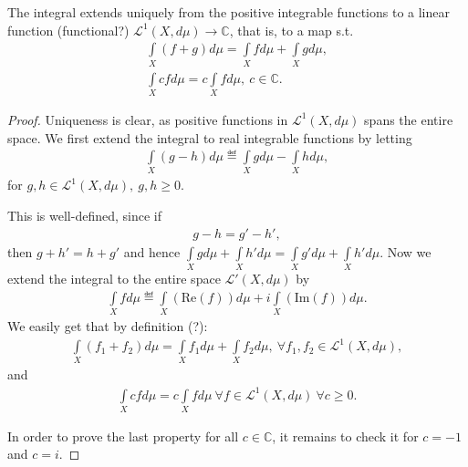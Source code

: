 \begin{prop}
    The integral extends uniquely from the positive integrable functions to a linear function (functional?) \(\mathcal{L}^{1}(X, d\mu) \rightarrow \mathbb{C}\),
    that is, to a map s.t.
    \begin{align*}
        \int\limits_{X}(f + g)d\mu = \int\limits_{X}fd\mu + \int\limits_{X}gd\mu, \\
        \int\limits_{X}cfd\mu = c \int\limits_{X}fd\mu, \ c\in\mathbb{C}.
    \end{align*}
\end{prop}
\begin{proof}
    Uniqueness is clear, as positive functions in \(\mathcal{L}^{1}(X, d\mu)\) spans the entire space. We first extend the integral to real
    integrable functions by letting
    \begin{align*}
        \int\limits_{X}(g-h)d\mu \eqdef \int\limits_{X}gd\mu - \int\limits_{X}hd\mu, 
    \end{align*}
    for \(g,h\in \mathcal{L}^{1}(X,d\mu), \ g,h\geq0\).

    This is well-defined, since if
    \begin{align*}
        g - h = g' - h',
    \end{align*}
    then \(g+h' = h + g'\) and hence \(\int\limits_{X}gd\mu + \int\limits_{X}h'd\mu = \int\limits_{X}g'd\mu + \int\limits_{X}h'd\mu\).
    Now we extend the integral to the entire space \(\mathcal{L}'(X,d\mu)\) by
    \begin{align*}
        \int\limits_{X}fd\mu \eqdef \int\limits_{X} (\text{Re}(f))d\mu + i \int\limits_{X}(\text{Im}(f))d\mu.
    \end{align*}
    We easily get that by definition (?):
    \begin{align*}
        \int\limits_{X}(f_1+f_2)d\mu = \int\limits_{X}f_1d\mu + \int\limits_{X}f_2d\mu, \ \forall f_1, f_2 \in \mathcal{L}^{1}(X, d\mu),
    \end{align*}
    and
    \begin{align*}
        \int\limits_{X}cfd\mu = c\int\limits_{X}fd\mu \ \forall f\in \mathcal{L}^{1}(X,d\mu) \ \forall c\geq 0.
    \end{align*}

    In order to prove the last property for all \(c\in\mathbb{C}\), it remains to check it for \(c=-1\) and \(c=i\).


\end{proof}
